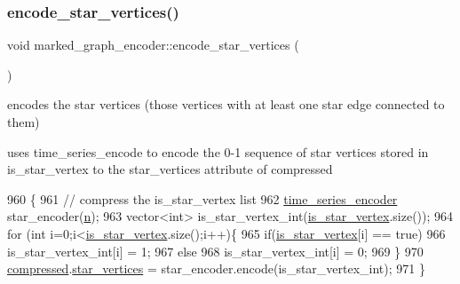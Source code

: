 \mbox{\label{classmarked__graph__encoder_af8daeed1452dbfd41fa2f875813e3496}} 
\subsubsection{\texorpdfstring{encode\+\_\+star\+\_\+vertices()}{encode\_star\_vertices()}}
{\footnotesize\ttfamily void marked\+\_\+graph\+\_\+encoder\+::encode\+\_\+star\+\_\+vertices (\begin{DoxyParamCaption}{ }\end{DoxyParamCaption})\hspace{0.3cm}{\ttfamily [private]}}



encodes the star vertices (those vertices with at least one star edge connected to them) 

uses time\+\_\+series\+\_\+encode to encode the 0-\/1 sequence of star vertices stored in is\+\_\+star\+\_\+vertex to the star\+\_\+vertices attribute of compressed 
\begin{DoxyCode}
960 \{
961   \textcolor{comment}{// compress the is\_star\_vertex list}
962   \hyperlink{classtime__series__encoder}{time\_series\_encoder} star\_encoder(\hyperlink{classmarked__graph__encoder_a4c66d9fdbc14c97523715aac7e4511cb}{n});
963   vector<int> is\_star\_vertex\_int(\hyperlink{classmarked__graph__encoder_ac36f6c2430af6fa4d20584569859bb59}{is\_star\_vertex}.size());
964   \textcolor{keywordflow}{for} (\textcolor{keywordtype}{int} i=0;i<\hyperlink{classmarked__graph__encoder_ac36f6c2430af6fa4d20584569859bb59}{is\_star\_vertex}.size();i++)\{
965     \textcolor{keywordflow}{if}(\hyperlink{classmarked__graph__encoder_ac36f6c2430af6fa4d20584569859bb59}{is\_star\_vertex}[i] == \textcolor{keyword}{true})
966       is\_star\_vertex\_int[i] = 1;
967     \textcolor{keywordflow}{else}
968       is\_star\_vertex\_int[i] = 0;
969   \}
970   \hyperlink{classmarked__graph__encoder_ac2ded200860fdd2321f86dd76b28bcb3}{compressed}.\hyperlink{classmarked__graph__compressed_a7a4ced4586e2e353f9076bd447df5208}{star\_vertices} = star\_encoder.encode(is\_star\_vertex\_int);
971 \}
\end{DoxyCode}
\mbox{\label{classmarked__graph__encoder_a239769085214166e09cb56de750a8d71}} 
